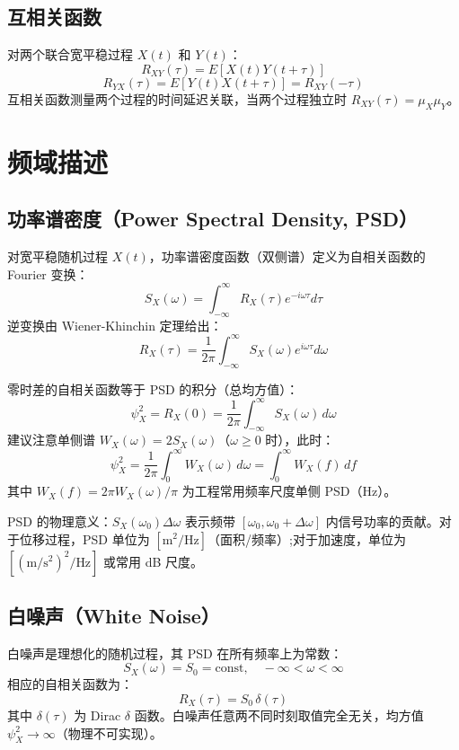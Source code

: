 \subsection{互相关函数}
\begin{definition}[互相关函数]
对两个联合宽平稳过程 $X(t)$ 和 $Y(t)$：
\[
R_{XY}(\tau) = E[X(t)Y(t+\tau)]
\]
\[
R_{YX}(\tau) = E[Y(t)X(t+\tau)] = R_{XY}(-\tau)
\]
互相关函数测量两个过程的时间延迟关联，当两个过程独立时 $R_{XY}(\tau) = \mu_X \mu_Y$。
\end{definition}

\section{频域描述}
\subsection{功率谱密度（Power Spectral Density, PSD）}
\begin{definition}[功率谱密度]
对宽平稳随机过程 $X(t)$，功率谱密度函数（双侧谱）定义为自相关函数的 Fourier 变换：
\[
S_X(\omega) = \int_{-\infty}^{\infty} R_X(\tau) e^{-i\omega\tau} d\tau
\]
逆变换由 Wiener-Khinchin 定理给出：
\[
R_X(\tau) = \frac{1}{2\pi}\int_{-\infty}^{\infty} S_X(\omega) e^{i\omega\tau} d\omega
\]
\end{definition}

\begin{myformula}
零时差的自相关函数等于 PSD 的积分（总均方值）：
\[
\psi_X^{2} = R_X(0) = \frac{1}{2\pi}\int_{-\infty}^{\infty} S_X(\omega)\,d\omega
\]
建议注意单侧谱 $W_X(\omega) = 2 S_X(\omega)$（$\omega \ge 0$ 时），此时：
\[
\psi_X^{2} = \frac{1}{2\pi}\int_{0}^{\infty} W_X(\omega)\,d\omega = \int_{0}^{\infty} W_X(f)\,df
\]
其中 $W_X(f) = 2\pi W_X(\omega)/\pi$ 为工程常用频率尺度单侧 PSD（Hz）。
\end{myformula}

PSD 的物理意义：$S_X(\omega_0)\Delta\omega$ 表示频带 $[\omega_0, \omega_0 + \Delta\omega]$ 内信号功率的贡献。对于位移过程，PSD 单位为 $[\text{m}^{2}/\text{Hz}]$（面积/频率）;对于加速度，单位为 $[(\text{m}/\text{s}^{2})^{2}/\text{Hz}]$ 或常用 dB 尺度。

\subsection{白噪声（White Noise）}
\begin{definition}[白噪声]
白噪声是理想化的随机过程，其 PSD 在所有频率上为常数：
\[
S_X(\omega) = S_0 = \text{const}, \quad -\infty < \omega < \infty
\]
相应的自相关函数为：
\[
R_X(\tau) = S_0\,\delta(\tau)
\]
其中 $\delta(\tau)$ 为 Dirac $\delta$ 函数。白噪声任意两不同时刻取值完全无关，均方值 $\psi_X^{2} \to \infty$（物理不可实现）。
\end{definition}

